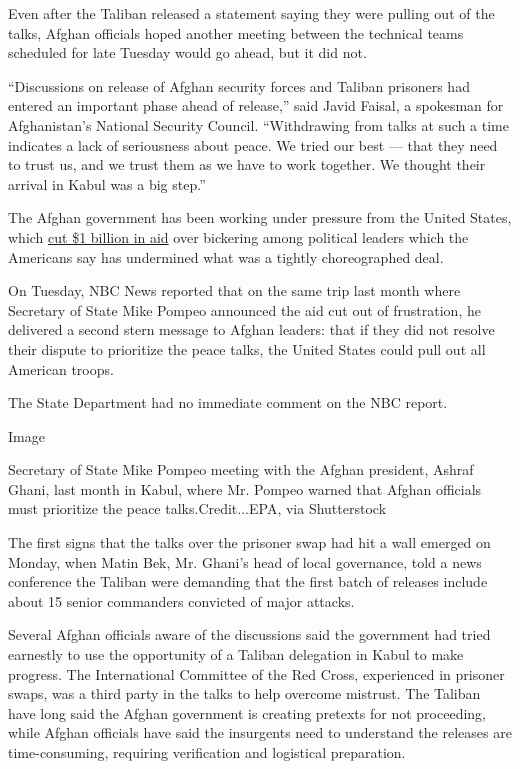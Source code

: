 Even after the Taliban released a statement saying they were pulling out
of the talks, Afghan officials hoped another meeting between the
technical teams scheduled for late Tuesday would go ahead, but it did
not.

``Discussions on release of Afghan security forces and Taliban prisoners
had entered an important phase ahead of release,'' said Javid Faisal, a
spokesman for Afghanistan's National Security Council. ``Withdrawing
from talks at such a time indicates a lack of seriousness about peace.
We tried our best --- that they need to trust us, and we trust them as
we have to work together. We thought their arrival in Kabul was a big
step.''

The Afghan government has been working under pressure from the United
States, which
\href{https://www.nytimes.com/2020/03/23/world/asia/afghanistan-taliban-peace-coronavirus.html}{cut
\$1 billion in aid} over bickering among political leaders which the
Americans say has undermined what was a tightly choreographed deal.

On Tuesday, NBC News reported that on the same trip last month where
Secretary of State Mike Pompeo announced the aid cut out of frustration,
he delivered a second stern message to Afghan leaders: that if they did
not resolve their dispute to prioritize the peace talks, the United
States could pull out all American troops.

The State Department had no immediate comment on the NBC report.

Image

Secretary of State Mike Pompeo meeting with the Afghan president, Ashraf
Ghani, last month in Kabul, where Mr. Pompeo warned that Afghan
officials must prioritize the peace talks.Credit...EPA, via Shutterstock

The first signs that the talks over the prisoner swap had hit a wall
emerged on Monday, when Matin Bek, Mr. Ghani's head of local governance,
told a news conference the Taliban were demanding that the first batch
of releases include about 15 senior commanders convicted of major
attacks.

Several Afghan officials aware of the discussions said the government
had tried earnestly to use the opportunity of a Taliban delegation in
Kabul to make progress. The International Committee of the Red Cross,
experienced in prisoner swaps, was a third party in the talks to help
overcome mistrust. The Taliban have long said the Afghan government is
creating pretexts for not proceeding, while Afghan officials have said
the insurgents need to understand the releases are time-consuming,
requiring verification and logistical preparation.

